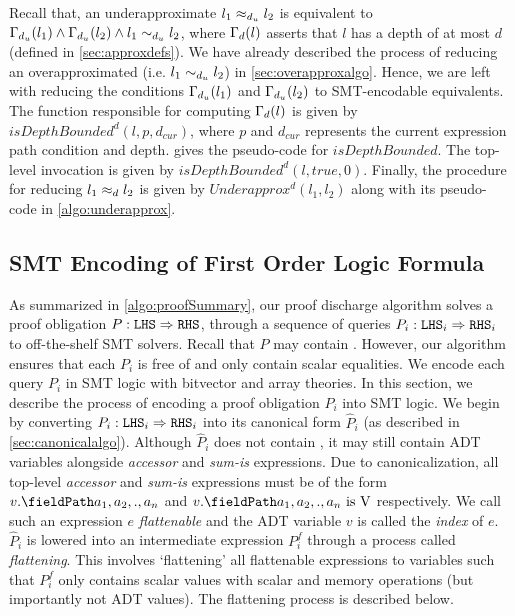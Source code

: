 Recall that, an underapproximate \recursiveRelation{} $l_1 \approx_{d_u} l_2$
is equivalent to $\Gamma_{d_u}(l_1) \land \Gamma_{d_u}(l_2) \land l_1 \sim_{d_u} l_2$,
where $\Gamma_{d}(l)$ asserts that $l$ has a depth of at most $d$ (defined in \cref{sec:approxdefs}).
We have already described the process of reducing an overapproximated \recursiveRelation{}
(i.e. $l_1 \sim_{d_u} l_2$) in \cref{sec:overapproxalgo}.
Hence, we are left with reducing the conditions $\Gamma_{d_u}(l_1)$ and $\Gamma_{d_u}(l_2)$
to SMT-encodable equivalents.
The function responsible for computing $\Gamma_{d}(l)$ is given by $isDepthBounded^d(l,p,d_{cur})$,
where $p$ and $d_{cur}$ represents the current expression path condition and depth.
 gives the pseudo-code for $isDepthBounded$.
The top-level invocation is given by $isDepthBounded^d(l,true,0)$.
Finally, the procedure for reducing $l_1 \approx_{d} l_2$ is given by $Underapprox^{d}(l_1,l_2)$
along with its pseudo-code in \cref{algo:underapprox}.




\subsection{SMT Encoding of First Order Logic Formula}
\label{sec:smtencoding}
As summarized in \cref{algo:proofSummary}, our proof discharge algorithm solves a proof obligation $P: {\tt LHS}{} \Rightarrow {\tt RHS}{}$,
through a sequence of queries $P_i : {\tt LHS}{}_i \Rightarrow {\tt RHS}{}_i$ to off-the-shelf SMT solvers.
Recall that $P$ may contain \recursiveRelations{}.
However, our algorithm ensures that each $P_i$ is free of \recursiveRelations{} and only contain
scalar equalities.
We encode each query $P_i$ in SMT logic with bitvector and array theories.
In this section, we describe the process of encoding a proof obligation $P_i$ into SMT logic.
We begin by converting $P_i : {\tt LHS}{}_i \Rightarrow {\tt RHS}{}_i$ into its canonical form $\hat{P}_i$
(as described in \cref{sec:canonicalalgo}).
Although $\hat{P}_i$ does not contain \recursiveRelations{}, it may still contain
ADT variables alongside {\em accessor} and {\em sum-is} expressions.
Due to canonicalization, all top-level {\em accessor} and {\em sum-is} expressions must be of the form
$\prodAccess{v}{a_1,a_2,.,a_n}$ and $\sumIs{\prodAccess{v}{a_1,a_2,.,a_n}}{\textnormal{V}}$ respectively.
We call such an expression $e$ {\em flattenable} and the ADT variable $v$ is called the {\em index} of $e$.
$\hat{P}_i$ is lowered into an intermediate expression $P_i^f$ through a process called {\em flattening}.
This involves `flattening' all flattenable expressions to variables such that
$P_i^f$ only contains scalar values with scalar and memory operations (but importantly not ADT values).
The flattening process is described below.

